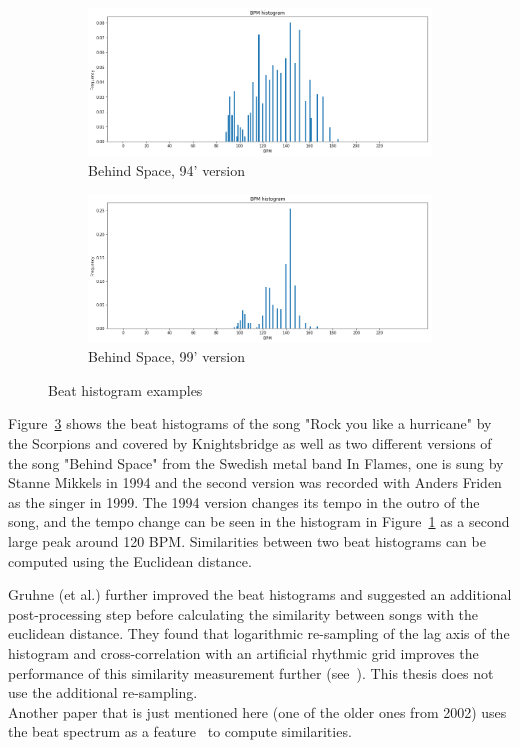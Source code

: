 \begin{figure}[htbp]
{{			\begin{subfigure}{.495\textwidth}
				\centering
				\includegraphics[scale=0.25]{Images/Beat/s_s_bh.png}
				\caption{Behind Space, 94' version}
				\label{ssbh}
			\end{subfigure}%
			\begin{subfigure}{.495\textwidth}
				\centering
				\includegraphics[scale=0.25]{Images/Beat/s_a_bh.png}
				\caption{Behind Space, 99' version}
				\label{sabh}
			\end{subfigure}%
	}}
	\caption{Beat histogram examples}
	\label{fig:bh1}
\end{figure}
\FloatBarrier

\noindent Figure~\ref{fig:bh1} shows the beat histograms of the song "Rock you like a hurricane" by the Scorpions and covered by Knightsbridge as well as two different versions of the song "Behind Space" from the Swedish metal band In Flames, one is sung by Stanne Mikkels in 1994 and the second version was recorded with Anders Friden as the singer in 1999. The 1994 version changes its tempo in the outro of the song, and the tempo change can be seen in the histogram in Figure~\ref{ssbh} as a second large peak around 120 BPM.
Similarities between two beat histograms can be computed using the Euclidean distance. 


\noindent Gruhne (et al.) further improved the beat histograms and suggested an additional post-processing step before calculating the similarity between songs with the euclidean distance. They found that logarithmic re-sampling of the lag axis of the histogram and cross-correlation with an artificial rhythmic grid improves the performance of this similarity measurement further (see~\cite[182]{rbh1}). This thesis does not use the additional re-sampling.\\
\noindent Another paper that is just mentioned here (one of the older ones from 2002) uses the beat spectrum as a feature~\cite{rhythm1} to compute similarities.

